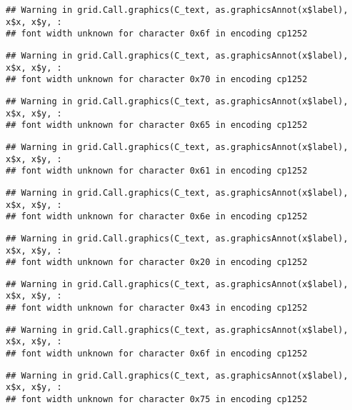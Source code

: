 \documentclass[
]{article}
\begin{document}
\begin{verbatim}
## Warning in grid.Call.graphics(C_text, as.graphicsAnnot(x$label), x$x, x$y, :
## font width unknown for character 0x6f in encoding cp1252
\end{verbatim}

\begin{verbatim}
## Warning in grid.Call.graphics(C_text, as.graphicsAnnot(x$label), x$x, x$y, :
## font width unknown for character 0x70 in encoding cp1252
\end{verbatim}

\begin{verbatim}
## Warning in grid.Call.graphics(C_text, as.graphicsAnnot(x$label), x$x, x$y, :
## font width unknown for character 0x65 in encoding cp1252
\end{verbatim}

\begin{verbatim}
## Warning in grid.Call.graphics(C_text, as.graphicsAnnot(x$label), x$x, x$y, :
## font width unknown for character 0x61 in encoding cp1252
\end{verbatim}

\begin{verbatim}
## Warning in grid.Call.graphics(C_text, as.graphicsAnnot(x$label), x$x, x$y, :
## font width unknown for character 0x6e in encoding cp1252
\end{verbatim}

\begin{verbatim}
## Warning in grid.Call.graphics(C_text, as.graphicsAnnot(x$label), x$x, x$y, :
## font width unknown for character 0x20 in encoding cp1252
\end{verbatim}

\begin{verbatim}
## Warning in grid.Call.graphics(C_text, as.graphicsAnnot(x$label), x$x, x$y, :
## font width unknown for character 0x43 in encoding cp1252
\end{verbatim}

\begin{verbatim}
## Warning in grid.Call.graphics(C_text, as.graphicsAnnot(x$label), x$x, x$y, :
## font width unknown for character 0x6f in encoding cp1252
\end{verbatim}

\begin{verbatim}
## Warning in grid.Call.graphics(C_text, as.graphicsAnnot(x$label), x$x, x$y, :
## font width unknown for character 0x75 in encoding cp1252
\end{verbatim}
\end{document}
